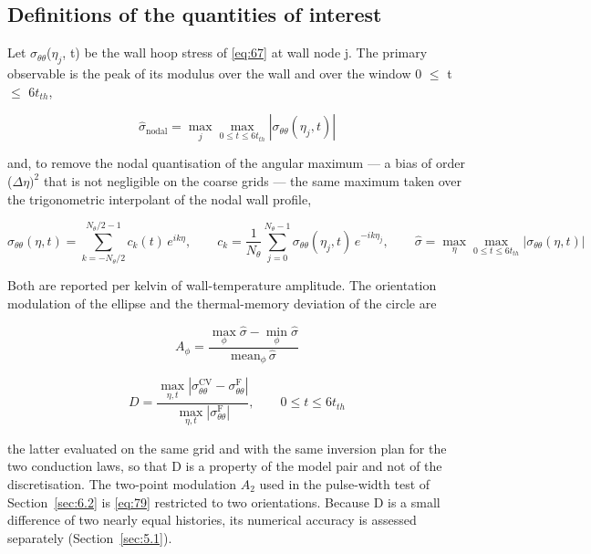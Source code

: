 \documentclass[preprint,12pt]{elsarticle}
\begin{document}
\subsection{Definitions of the quantities of interest}
\label{sec:4.7}

Let $\sigma_{\theta\theta}$($\eta_{j}$, t) be the wall hoop stress of \eqref{eq:67} at wall node j. The primary observable is the peak of its modulus over the wall and over the window 0 $\leq$ t $\leq$ $6t_{th}$,

\begin{equation}
\hat\sigma_{\mathrm{nodal}}=\max_{j}\max_{0\leq t\leq 6t_{th}}|\sigma_{\theta\theta}(\eta_j,t)| 
\label{eq:77}
\end{equation}

and, to remove the nodal quantisation of the angular maximum --- a bias of order ($\Delta \eta )^{2}$ that is not negligible on the coarse grids --- the same maximum taken over the trigonometric interpolant of the nodal wall profile,

\begin{equation}
\sigma_{\theta\theta}(\eta,t)=\sum_{k=-N_\theta/2}^{N_\theta/2-1}c_k(t)\,e^{ik\eta},\qquad c_k=\frac{1}{N_\theta}\sum_{j=0}^{N_\theta-1}\sigma_{\theta\theta}(\eta_j,t)\,e^{-ik\eta_j},\qquad \hat\sigma=\max_{\eta}\max_{0\leq t\leq 6t_{th}}|\sigma_{\theta\theta}(\eta,t)| 
\label{eq:78}
\end{equation}

Both are reported per kelvin of wall-temperature amplitude. The orientation modulation of the ellipse and the thermal-memory deviation of the circle are

\begin{equation}
A_\phi=\frac{\max_\phi\hat\sigma-\min_\phi\hat\sigma}{\mathrm{mean}_\phi\,\hat\sigma} 
\label{eq:79}
\end{equation}

\begin{equation}
D=\frac{\max_{\eta,t}|\sigma_{\theta\theta}^{\mathrm{CV}}-\sigma_{\theta\theta}^{\mathrm{F}}|}{\max_{\eta,t}|\sigma_{\theta\theta}^{\mathrm{F}}|},\qquad 0\leq t\leq 6t_{th} 
\label{eq:80}
\end{equation}

the latter evaluated on the same grid and with the same inversion plan for the two conduction laws, so that D is a property of the model pair and not of the discretisation. The two-point modulation $A_{2}$ used in the pulse-width test of Section~\ref{sec:6.2} is \eqref{eq:79} restricted to two orientations. Because D is a small difference of two nearly equal histories, its numerical accuracy is assessed separately (Section~\ref{sec:5.1}).
\end{document}
